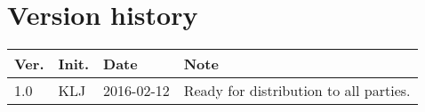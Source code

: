 \chapter*{Version history}
\label{app:rev_his}


\begin{tabular}{b{1cm} b{1cm} b{2cm} b{8cm}}
    \textbf{Ver.} & \textbf{Init.} & \textbf{Date} & \textbf{Note} \\
    \hline
    1.0 & KLJ & 2016-02-12 & Ready for distribution to all parties. \\
\end{tabular}
